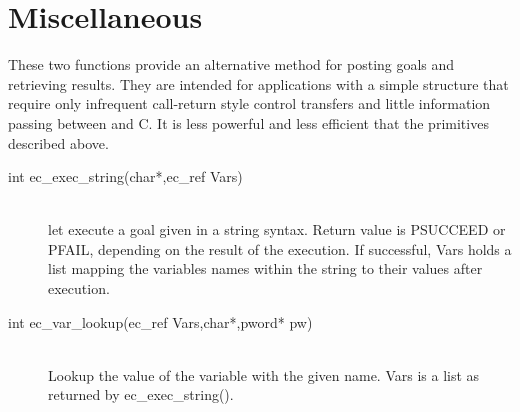 \section{Miscellaneous}
These two functions provide an alternative method for posting goals and
retrieving results. They are intended for applications with a simple structure
that require only infrequent call-return style control transfers
and little information passing between {\eclipse} and C. It is less powerful
and less efficient that the primitives described above.
\begin{description}
\item[int		ec_exec_string(char*,ec_ref Vars)]\ \\
	let {\eclipse} execute a goal given in a string {\eclipse} syntax.
	Return value is PSUCCEED or PFAIL, depending on the result of
	the execution. If successful, Vars holds a list mapping the
	variables names within the string to their values after execution.

\item[int		ec_var_lookup(ec_ref Vars,char*,pword* pw)]\ \\
	Lookup the value of the variable with the given name.
	Vars is a list as returned by ec_exec_string().
\end{description}

